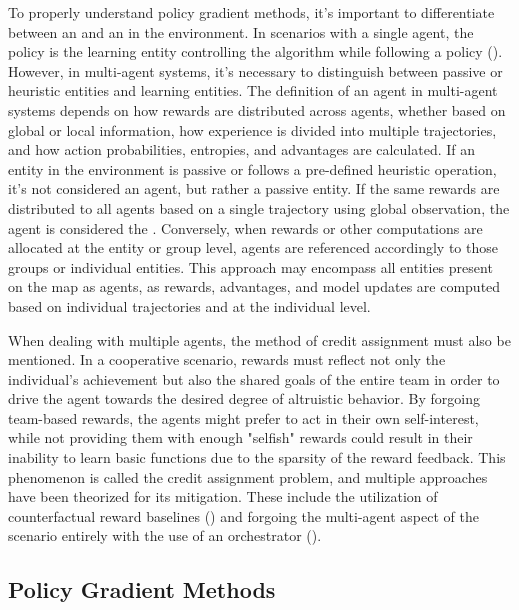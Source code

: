 \bigskip

\noindent To properly understand policy gradient methods, it's important to differentiate between an  and an  in the environment. In scenarios with a single agent, the policy is the learning entity controlling the algorithm while following a policy (\textcolor{deepblue}{\cite{Sutton1998}}). However, in multi-agent systems, it's necessary to distinguish between passive or heuristic entities and learning entities. The definition of an agent in multi-agent systems depends on how rewards are distributed across agents, whether based on global or local information, how experience is divided into multiple trajectories, and how action probabilities, entropies, and advantages are calculated. If an entity in the environment is passive or follows a pre-defined heuristic operation, it's not considered an agent, but rather a passive entity. If the same rewards are distributed to all agents based on a single trajectory using global observation, the agent is considered the . Conversely, when rewards or other computations are allocated at the entity or group level, agents are referenced accordingly to those groups or individual entities. This approach may encompass all entities present on the map as agents, as rewards, advantages, and model updates are computed based on individual trajectories and at the individual level.

\bigskip

\noindent When dealing with multiple agents, the method of credit assignment must also be mentioned. In a cooperative scenario, rewards must reflect not only the individual's achievement but also the shared goals of the entire team in order to drive the agent towards the desired degree of altruistic behavior. By forgoing team-based rewards, the agents might prefer to act in their own self-interest, while not providing them with enough "selfish" rewards could result in their inability to learn basic functions due to the sparsity of the reward feedback. This phenomenon is called the credit assignment problem, and multiple approaches have been theorized for its mitigation. These include the utilization of counterfactual reward baselines (\cite{foerster2017counterfactual}) and forgoing the multi-agent aspect of the scenario entirely with the use of an orchestrator (\cite{chen2023emergent}).


\subsection{Policy Gradient Methods}
\label{sec:Policy-Gradient-Methods}

